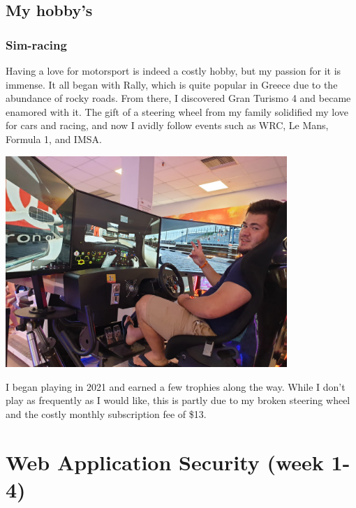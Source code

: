 \documentclass[12pt, letterpaper]{article}
\begin{document}
\subsection{My hobby's}

\subsubsection{Sim-racing}
Having a love for motorsport is indeed a costly hobby, but my passion for it is immense. It all began with Rally, which is quite popular in Greece due to the abundance of rocky roads. From there, I discovered Gran Turismo 4 and became enamored with it. The gift of a steering wheel from my family solidified my love for cars and racing, and now I avidly follow events such as WRC, Le Mans, Formula 1, and IMSA.
\begin{center}
    \includegraphics[width=0.8\textwidth]{fotos/simracingkosta.jpeg}
\end{center}
I began playing in 2021 and earned a few trophies along the way. While I don't play as frequently as I would like, this is partly due to my broken steering wheel and the costly monthly subscription fee of \$13.


\newpage
\section{Web Application Security (week 1-4)}
\end{document}
